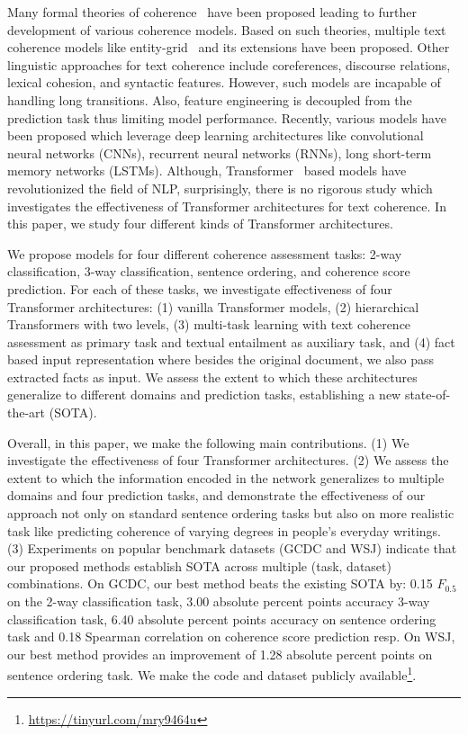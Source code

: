 \documentclass[11pt]{article}
\begin{document}
Many formal theories of coherence~\cite{grosz1995centering,mann1988rhetorical,asher2003logics} have been proposed leading to further development of various coherence models. Based on such theories, multiple text coherence models like entity-grid~\cite{barzilay2008modeling} and its extensions have been proposed. Other linguistic approaches for text coherence include coreferences, discourse relations, lexical cohesion, and syntactic features.  However, such models are incapable of handling long transitions. Also, feature engineering is decoupled from the prediction task thus limiting model performance. Recently, various models have been proposed which leverage deep learning architectures like convolutional neural networks (CNNs), recurrent neural networks (RNNs), long short-term memory networks (LSTMs). Although, Transformer~\cite{vaswani2017attention} based models have revolutionized the field of NLP, surprisingly, there is no rigorous study which investigates the effectiveness of Transformer architectures for text coherence. In this paper, we study four different kinds of Transformer architectures.

We propose models for four different coherence assessment tasks: 2-way classification, 3-way classification, sentence ordering, and coherence score prediction. For each of these tasks, we investigate effectiveness of four Transformer architectures: (1) vanilla Transformer models, (2) hierarchical Transformers with two levels, (3) multi-task learning with text coherence assessment as primary task and textual entailment as auxiliary task, and (4) fact based input representation where besides the original document, we also pass extracted facts as input. We assess the extent to which these architectures generalize to different domains and prediction tasks, establishing a new state-of-the-art (SOTA).

Overall, in this paper, we make the following main contributions. (1)
We investigate the effectiveness of four Transformer architectures. (2) We assess the extent to which the information encoded in the network generalizes to multiple domains and four prediction tasks, and demonstrate the effectiveness of our approach not only on standard sentence ordering tasks but also on more realistic task like predicting coherence of varying degrees in people's everyday writings. (3) Experiments on popular benchmark datasets (GCDC and WSJ) indicate that our proposed methods establish SOTA across multiple (task, dataset) combinations. On GCDC, our best method beats the existing SOTA by: 0.15 $F_{0.5}$ on the 2-way classification task, 3.00 absolute percent points accuracy 3-way classification task, 6.40 absolute percent points accuracy on sentence ordering task and 0.18 Spearman correlation on coherence score prediction resp. On WSJ, our best method provides an improvement of 1.28 absolute percent points on sentence ordering task. We make the code and dataset publicly available\footnote{\url{https://tinyurl.com/mry9464u}}.
\end{document}
